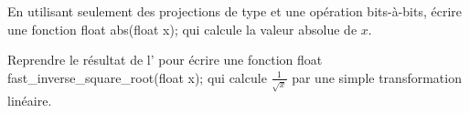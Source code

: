 \documentclass[../../../main.tex]{subfiles}
\begin{document}
En utilisant seulement des projections de type et une opération bits-à-bits, écrire une fonction \textsf{float abs(float x);} qui calcule la valeur absolue de $x$.

Reprendre le résultat de l' pour écrire une fonction \textsf{float fast\_inverse\_square\_root(float x);} qui calcule $\frac{1}{\sqrt{x}}$ par une simple transformation linéaire.
\end{document}
